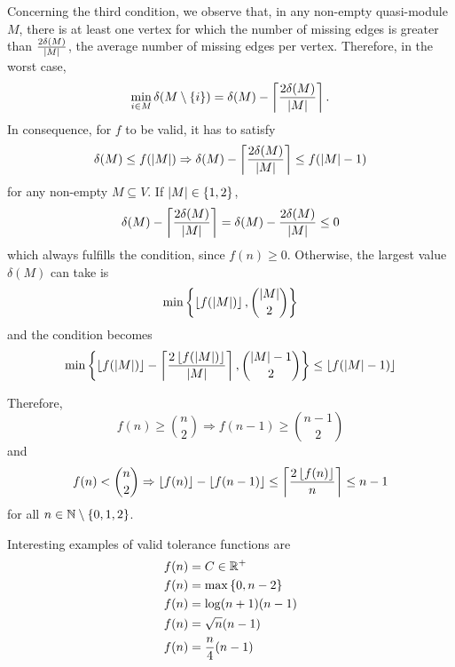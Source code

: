 \documentclass[a4paper, 12pt]{article}
\begin{document}
    Concerning the third condition, we observe that, in any non-empty quasi-module $M$, there is at least one vertex for which the number of missing edges is greater than $\frac{ 2 \delta(M)}{\left|M\right|}$, the average number of missing edges per vertex. Therefore, in the worst case,
    \begin{equation}
        \min_{i \in M} \delta(M \setminus \left\{i\right\}) = \delta(M) - \left\lceil\frac{2 \delta(M)}{\left|M\right|}\right\rceil .
    \end{equation}
    In consequence, for $f$ to be valid, it has to satisfy
    \begin{equation}
        \delta(M) \leq f(\left|M\right|) \Rightarrow \delta(M) - \left\lceil\frac{2 \delta(M)}{\left|M\right|}\right\rceil \leq f(\left|M\right| - 1)
    \end{equation}
    for any non-empty $M \subseteq V$. If $\left|M\right| \in \left\{1, 2\right\}$,
    \begin{equation}
        \delta(M) - \left\lceil\frac{2 \delta(M)}{\left|M\right|}\right\rceil = \delta(M) - \frac{2 \delta(M)}{\left|M\right|} \leq 0
    \end{equation}
    which always fulfills the condition, since $f(n) \geq 0$. Otherwise, the largest value $\delta(M)$ can take is
    \begin{equation}
        \min \left\{ \left\lfloor f(\left|M\right|)\right\rfloor, \binom{\left|M\right|}{2} \right\}
    \end{equation}
    and the condition becomes
    \begin{equation}
        \min \left\{ \left\lfloor f(\left|M\right|)\right\rfloor - \left\lceil\frac{2\left\lfloor f(\left|M\right|)\right\rfloor}{\left|M\right|}\right\rceil, \binom{\left|M\right| - 1}{2}\right\} \leq \left\lfloor f(\left|M\right| - 1)\right\rfloor
    \end{equation}
    
    Therefore,
    \begin{equation}
        f(n) \geq \binom{n}{2} \Rightarrow f(n - 1) \geq \binom{n - 1}{2}
    \end{equation}
    and
    \begin{equation}
        f(n) < \binom{n}{2} \Rightarrow \left\lfloor f(n)\right\rfloor - \left\lfloor f(n - 1)\right\rfloor \leq \left\lceil\frac{2 \left\lfloor f(n)\right\rfloor}{n}\right\rceil \leq n - 1
    \end{equation}
    for all $n \in \mathbb{N} \setminus \left\{0, 1, 2\right\}$.
    
    Interesting examples of valid tolerance functions are
    \begin{align*}
        f(n) & = C \in \mathbb{R}^+ \\
        f(n) & = \max \left\{0, n - 2\right\} \\
        f(n) & = \log(n + 1) (n - 1) \\
        f(n) & = \sqrt{n} (n - 1) \\
        f(n) & = \frac{n}{4} (n - 1)
    \end{align*}
    
\end{document}

